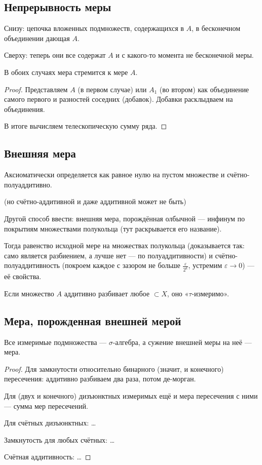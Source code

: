 \documentclass[12pt, a4paper, oneside]{memoir}
\begin{document}
\subsection{Непрерывность меры}

Снизу: цепочка вложенных подмножеств, содержащихся в $A$, в бесконечном объединении дающая $A$.

Сверху: теперь они все содержат $A$ и с какого-то момента не бесконечной меры.

В обоих случаях мера стремится к мере $A$.

\begin{proof}
    Представляем $A$ (в первом случае) или $A_1$ (во втором) как объединение самого первого и разностей соседних (добавок).
    Добавки расклыдваем на объединения.

    В итоге вычисляем телескопическую сумму ряда.
\end{proof}


\subsection{Внешняя мера}

Аксиоматически определяется как равное нулю на пустом множестве и счётно-полуаддитивно.

(но счётно-аддитивной и даже аддитивной может не быть)

Другой способ ввести: внешняя мера, порождённая олбычной — инфинум по покрытиям множествами полукольца (тут раскрывается его название).

Тогда равенство исходной мере на множествах полукольца (доказывается так: само является разбиением, а лучше нет — по полуаддитивности) 
и счётно-полуаддитивность (покроем каждое с зазором не больше $\frac{\varepsilon}{2^k}$, устремим $\varepsilon → 0$)
 — её свойства.

Если множество $A$ аддитивно разбивает любое $\subset X$, оно «$\tau$-измеримо».


\subsection{Мера, порожденная внешней мерой}

\begin{theorem}

    Все измеримые подмножества — $\sigma$-алгебра, а сужение внешней меры на неё — мера.

    \begin{proof}
        Для замкнутости относительно бинарного (значит, и конечного) пересечения: аддитивно разбиваем два раза, потом де-морган.

        Для (двух и конечного) дизъюнктных измеримых ещё и мера пересечения с ними — сумма мер пересечений.

        Для счётных дизъюнктных: …

        Замкнутость для любых счётных: …

        Счётная аддитивность: …
    \end{proof}
\end{theorem}
\end{document}
